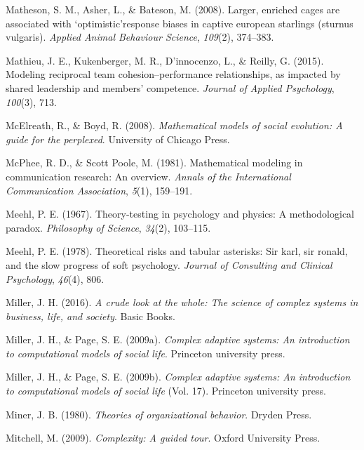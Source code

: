 \documentclass[english,,man]{apa6}
\theoremstyle{definition}
\theoremstyle{definition}
\theoremstyle{definition}
\theoremstyle{remark}
\begin{document}
\leavevmode\hypertarget{ref-matheson2008}{}%
Matheson, S. M., Asher, L., \& Bateson, M. (2008). Larger, enriched
cages are associated with `optimistic'response biases in captive
european starlings (sturnus vulgaris). \emph{Applied Animal Behaviour
Science}, \emph{109}(2), 374--383.

\leavevmode\hypertarget{ref-mathieu2015}{}%
Mathieu, J. E., Kukenberger, M. R., D'innocenzo, L., \& Reilly, G.
(2015). Modeling reciprocal team cohesion--performance relationships, as
impacted by shared leadership and members' competence. \emph{Journal of
Applied Psychology}, \emph{100}(3), 713.

\leavevmode\hypertarget{ref-mcelreath2008mathematical}{}%
McElreath, R., \& Boyd, R. (2008). \emph{Mathematical models of social
evolution: A guide for the perplexed}. University of Chicago Press.

\leavevmode\hypertarget{ref-mcphee1981}{}%
McPhee, R. D., \& Scott Poole, M. (1981). Mathematical modeling in
communication research: An overview. \emph{Annals of the International
Communication Association}, \emph{5}(1), 159--191.

\leavevmode\hypertarget{ref-meehl1967}{}%
Meehl, P. E. (1967). Theory-testing in psychology and physics: A
methodological paradox. \emph{Philosophy of Science}, \emph{34}(2),
103--115.

\leavevmode\hypertarget{ref-meehl1978}{}%
Meehl, P. E. (1978). Theoretical risks and tabular asterisks: Sir karl,
sir ronald, and the slow progress of soft psychology. \emph{Journal of
Consulting and Clinical Psychology}, \emph{46}(4), 806.

\leavevmode\hypertarget{ref-miller2016crude}{}%
Miller, J. H. (2016). \emph{A crude look at the whole: The science of
complex systems in business, life, and society}. Basic Books.

\leavevmode\hypertarget{ref-miller2009}{}%
Miller, J. H., \& Page, S. E. (2009a). \emph{Complex adaptive systems:
An introduction to computational models of social life}. Princeton
university press.

\leavevmode\hypertarget{ref-miller2009complex}{}%
Miller, J. H., \& Page, S. E. (2009b). \emph{Complex adaptive systems:
An introduction to computational models of social life} (Vol. 17).
Princeton university press.

\leavevmode\hypertarget{ref-miner1980}{}%
Miner, J. B. (1980). \emph{Theories of organizational behavior}. Dryden
Press.

\leavevmode\hypertarget{ref-mitchell2009}{}%
Mitchell, M. (2009). \emph{Complexity: A guided tour}. Oxford University
Press.
\end{document}
